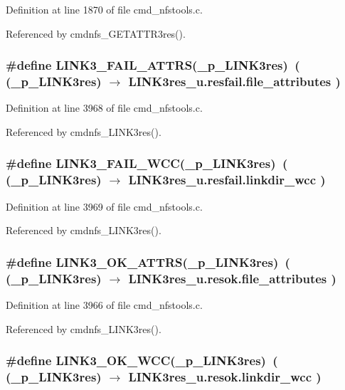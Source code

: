 Definition at line 1870 of file cmd\_\-nfstools.c.

Referenced by cmdnfs\_\-GETATTR3res().
\subsubsection{\setlength{\rightskip}{0pt plus 5cm}\#define LINK3\_\-FAIL\_\-ATTRS(\_\-p\_\-LINK3res)\ ( (\_\-p\_\-LINK3res) $\rightarrow$ LINK3res\_\-u.resfail.file\_\-attributes )}\label{cmd__nfstools_8c_a45}




Definition at line 3968 of file cmd\_\-nfstools.c.

Referenced by cmdnfs\_\-LINK3res().
\subsubsection{\setlength{\rightskip}{0pt plus 5cm}\#define LINK3\_\-FAIL\_\-WCC(\_\-p\_\-LINK3res)\ ( (\_\-p\_\-LINK3res) $\rightarrow$ LINK3res\_\-u.resfail.linkdir\_\-wcc )}\label{cmd__nfstools_8c_a46}




Definition at line 3969 of file cmd\_\-nfstools.c.

Referenced by cmdnfs\_\-LINK3res().
\subsubsection{\setlength{\rightskip}{0pt plus 5cm}\#define LINK3\_\-OK\_\-ATTRS(\_\-p\_\-LINK3res)\ ( (\_\-p\_\-LINK3res) $\rightarrow$ LINK3res\_\-u.resok.file\_\-attributes )}\label{cmd__nfstools_8c_a43}




Definition at line 3966 of file cmd\_\-nfstools.c.

Referenced by cmdnfs\_\-LINK3res().
\subsubsection{\setlength{\rightskip}{0pt plus 5cm}\#define LINK3\_\-OK\_\-WCC(\_\-p\_\-LINK3res)\ ( (\_\-p\_\-LINK3res) $\rightarrow$ LINK3res\_\-u.resok.linkdir\_\-wcc )}\label{cmd__nfstools_8c_a44}




